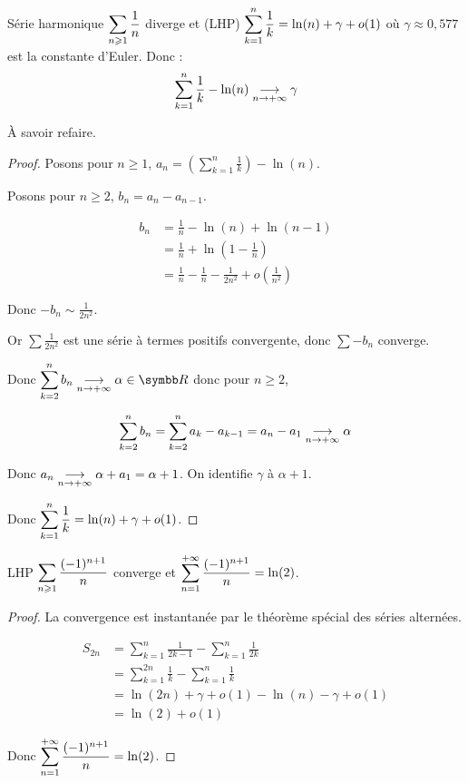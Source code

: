 \begin{proposition}{Série harmonique}{}
    $\displaystyle \sum_{n \geqslant 1} \frac 1 n$ diverge et (LHP)
    $\displaystyle \sum_{k = 1 }^{n } \frac 1 k = \ln(n) + \gamma + o(1)$ où $\gamma \approx 0,577$ est la constante d'Euler.
    Donc :
    \[\sum_{k = 1}^{n} \frac 1 k - \ln(n) \underset{n \to + \infty}{\longrightarrow} \gamma\]
\end{proposition}

\begin{remarque}
    À savoir refaire.
\end{remarque}


\begin{proof}
    Posons pour $n \geqslant 1$, $\displaystyle a_n = \left( \sum_{k = 1 }^{n } \frac 1 k \right) - \ln(n)$.

    Posons pour $n \geqslant 2$, $b_n = a_n - a_{n - 1}$. 

    \begin{align*}
        b_n & = \frac 1 n - \ln(n) + \ln(n - 1) \\
            & = \frac 1 n + \ln\left( 1 - \frac 1 n \right) \\
            & = \frac 1 n -  \frac 1 n - \frac 1 {2 n^2} + o\left( \frac 1 {n^2} \right) 
    \end{align*}

    Donc $- b_n \sim \frac 1 {2 n^2}$.

    Or $\sum \frac 1 {2 n^2}$ est une série à termes positifs convergente, donc 
    $\sum - b_n$ converge.

    Donc $\ds \sum_{k=2}^n b_n \limit{n}{+ \infty} \alpha\in\R$ donc pour $n \geqslant 2$,

    \[\sum_{k=2}^{n} b_n  = \sum_{k=2}^{n} a_k - a_{k-1} = a_n - a_1\underset{n \to +\infty}{\longrightarrow} \alpha\]

    Donc $a_n \underset{n \to +\infty}{\longrightarrow} \alpha + a_1 = \alpha + 1$. On identifie $\gamma$ à $\alpha + 1$.

    Donc $\displaystyle \sum_{k=1}^{n} \frac 1 k = \ln(n) + \gamma + o(1)$.
\end{proof}

\begin{proposition}{LHP}{}
    $\displaystyle \sum_{n \geqslant 1} \frac {(-1)^{n+1}} n$ converge et $\displaystyle \sum_{n=1}^{+\infty} \frac {(-1)^{n+1}} n = \ln(2)$.
\end{proposition}

\begin{proof}
    La convergence est instantanée par le théorème spécial des séries alternées.

    \begin{align*}
        S_{2n}  &= \sum_{k=1}^n \frac 1 {2k - 1} - \sum_{k=1}^n \frac 1 {2k} \\
                &= \sum_{k=1}^{2n} \frac 1 k - \sum_{k=1}^n \frac 1 k\\
                &= \ln(2n) + \gamma + o(1) - \ln(n) - \gamma + o(1) \\
                &= \ln(2) + o(1)
    \end{align*}

    Donc $\displaystyle \sum_{n=1}^{+\infty} \frac {(-1)^{n+1}} n = \ln(2)$.
\end{proof}

